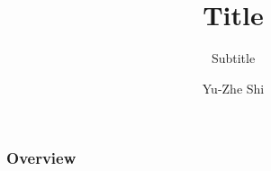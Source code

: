 \documentclass{beamer}
\title[About Beamer] %
{Title}
\subtitle{Subtitle}
\author[Yu-Zhe Shi] %
{Yu-Zhe Shi}
\begin{document}
\maketitle
\begin{frame}
    \frametitle{Overview}


\end{frame}
\end{document}
